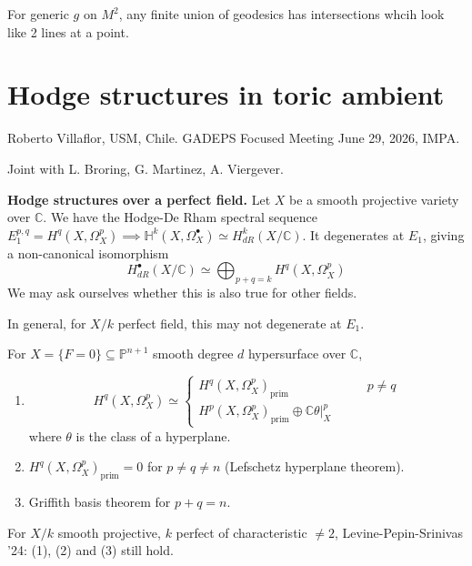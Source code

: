 \begin{theorem}
\label{theorem-geodesics-intersect}
For generic $g$ on $M^2$,
any finite union of geodesics has
intersections
whcih look like 2 lines at a point.
\end{theorem}

\section{Hodge structures in toric ambient}
\label{section-hodge-structures-toric-ambient}

\noindent
Roberto Villaflor, USM, Chile.
GADEPS Focused Meeting June 29, 2026, IMPA.

\medskip\noindent
Joint with L. Broring, G. Martinez,
A. Viergever.

\medskip\noindent
{\bf Hodge structures over a perfect
field.} Let $X$ be a smooth
projective variety over $\mathbb{C}$.
We have the Hodge-De Rham spectral sequence
$E^{p,q}_1=H^q(X,\Omega_X^p) 
\implies \mathbb{H}^k(X,\Omega_X^\bullet)
\simeq H^k_{dR}(X/\mathbb{C})$.
It degenerates at $E_1$, giving
a non-canonical isomorphism
$$
H^\bullet_{dR}(X/\mathbb{C})
\simeq
\bigoplus_{p+q=k}H^q(X,\Omega_X^p)
$$
We may ask ourselves whether this is also
true for other fields.

\begin{remark}
\label{remark-derham-to-hodge-not-degenerate}
In general, for $X/k$ perfect field,
this may not degenerate at $E_1$.
\end{remark}

\noindent
For $X = \{F=0\} \subseteq \mathbb{P}^{n+1}$
smooth degree $d$ hypersurface over
$\mathbb{C}$,
\begin{enumerate}
\item 
$$
H^q(X,\Omega_X^p)
\simeq \begin{cases}
H^q(X,\Omega_X^p)_{\operatorname{prim}}\qquad
&p \neq q \\
H^p(X,\Omega_X^p)_{\operatorname{prim}}\oplus
\mathbb{C}\theta |_X^p\qquad &
\end{cases}
$$
where $\theta$ is the class of a hyperplane.

\item
$H^q(X,\Omega_X^p)_{\operatorname{prim}}=0$
for $p \neq q \neq  n$ 
(Lefschetz hyperplane theorem).

\item Griffith basis theorem for $p+q=n$.
\end{enumerate}

\begin{remark}
\label{remark-lps}
For $X/k$ smooth projective, $k$ perfect
of characteristic $\neq 2$,
Levine-Pepin-Srinivas '24: (1), (2)
and (3) still hold.
\end{remark}

